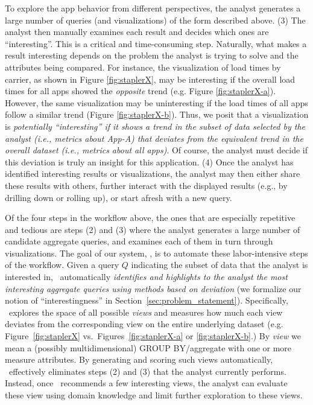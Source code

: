 To explore the app behavior from different perspectives, the analyst generates
a large number of queries (and visualizations) of the form described above.
(3) The analyst then manually examines each result and decides
which ones are ``interesting''. This is a critical and time-consuming step.
Naturally, what makes a result interesting depends on the 
problem the analyst is trying to solve and the
attributes being compared.
For instance, the visualization of load times by carrier, as shown in Figure
\ref{fig:staplerX}, may be interesting if the overall load times for all
apps showed the {\it opposite} trend (e.g. Figure \ref{fig:staplerX-a}).
However, the same visualization may be uninteresting if the load times of all apps
follow a similar trend (Figure \ref{fig:staplerX-b}).
Thus, we posit that  a visualization is {\em potentially ``interesting'' if it shows 
a trend in the subset of data selected by the analyst
(i.e., metrics about App-A)
that deviates from the equivalent trend in the overall dataset (i.e., metrics
about all apps)}.
Of course, the analyst must decide if this deviation 
is truly an insight for this application.
(4) Once the analyst has identified interesting results or
visualizations, the analyst may
then either share these results with others, further interact with
the displayed results (e.g., by drilling down or rolling up), or
start afresh with a new query.


Of the four steps in the workflow above, the 
ones that are especially repetitive and tedious are steps (2) and (3)
where the analyst generates a large number of candidate aggregate queries, 
and examines each
of them in turn through visualizations.
The goal of our system, \VizRecDB, is to automate these 
labor-intensive steps of the workflow. 
Given a query $Q$ indicating the subset
of data that the analyst is interested in, \VizRecDB\ automatically {\em
identifies and highlights to the analyst the most interesting aggregate queries
using methods based on deviation} (we formalize our notion of ``interestingness'' in Section~\ref{sec:problem_statement}).
Specifically, \VizRecDB\ explores the space of all possible {\it views} and
measures how much each view deviates from the corresponding view on the entire underlying dataset (e.g. Figure~\ref{fig:staplerX} vs.~Figures~\ref{fig:staplerX-a} or \ref{fig:staplerX-b}.) 
By {\it view} we mean a (possibly multidimensional) GROUP BY/aggregate with one or more
measure attributes.
By generating and
scoring such views automatically, \VizRecDB\ effectively eliminates
steps (2) and (3) that the analyst currently performs. 
Instead, once \VizRecDB\
recommends a few interesting views, the analyst can evaluate these
view using domain knowledge and limit further
exploration to these views.  

